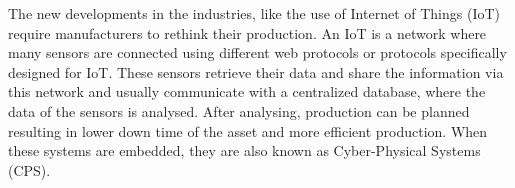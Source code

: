 The new developments in the industries, like the use of Internet of Things (IoT) require manufacturers to rethink their production. An IoT is a network where many sensors are connected using different web protocols or protocols specifically designed for IoT. These sensors retrieve their data and share the information via this network and usually communicate with a centralized database, where the data of the sensors is analysed. After analysing, production can be planned resulting in lower down time of the asset and more efficient production. When these systems are embedded, they are also known as Cyber-Physical Systems (CPS). 



